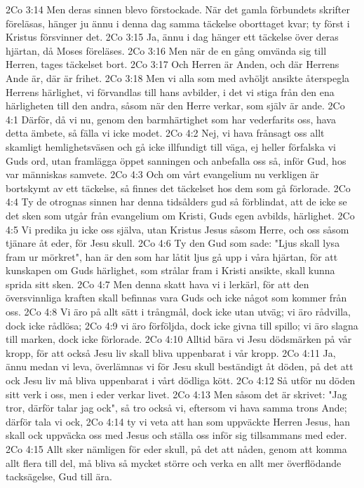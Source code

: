 2Co 3:14  Men deras sinnen blevo förstockade. När det gamla förbundets skrifter föreläsas, hänger ju ännu i denna dag samma täckelse oborttaget kvar; ty först i Kristus försvinner det.
2Co 3:15  Ja, ännu i dag hänger ett täckelse över deras hjärtan, då Moses föreläses.
2Co 3:16  Men när de en gång omvända sig till Herren, tages täckelset bort.
2Co 3:17  Och Herren är Anden, och där Herrens Ande är, där är frihet.
2Co 3:18  Men vi alla som med avhöljt ansikte återspegla Herrens härlighet, vi förvandlas till hans avbilder, i det vi stiga från den ena härligheten till den andra, såsom när den Herre verkar, som själv är ande.
2Co 4:1  Därför, då vi nu, genom den barmhärtighet som har vederfarits oss, hava detta ämbete, så fälla vi icke modet.
2Co 4:2  Nej, vi hava frånsagt oss allt skamligt hemlighetsväsen och gå icke illfundigt till väga, ej heller förfalska vi Guds ord, utan framlägga öppet sanningen och anbefalla oss så, inför Gud, hos var människas samvete.
2Co 4:3  Och om vårt evangelium nu verkligen är bortskymt av ett täckelse, så finnes det täckelset hos dem som gå förlorade.
2Co 4:4  Ty de otrognas sinnen har denna tidsålders gud så förblindat, att de icke se det sken som utgår från evangelium om Kristi, Guds egen avbilds, härlighet.
2Co 4:5  Vi predika ju icke oss själva, utan Kristus Jesus såsom Herre, och oss såsom tjänare åt eder, för Jesu skull.
2Co 4:6  Ty den Gud som sade: "Ljus skall lysa fram ur mörkret", han är den som har låtit ljus gå upp i våra hjärtan, för att kunskapen om Guds härlighet, som strålar fram i Kristi ansikte, skall kunna sprida sitt sken.
2Co 4:7  Men denna skatt hava vi i lerkärl, för att den översvinnliga kraften skall befinnas vara Guds och icke något som kommer från oss.
2Co 4:8  Vi äro på allt sätt i trångmål, dock icke utan utväg; vi äro rådvilla, dock icke rådlösa;
2Co 4:9  vi äro förföljda, dock icke givna till spillo; vi äro slagna till marken, dock icke förlorade.
2Co 4:10  Alltid bära vi Jesu dödsmärken på vår kropp, för att också Jesu liv skall bliva uppenbarat i vår kropp.
2Co 4:11  Ja, ännu medan vi leva, överlämnas vi för Jesu skull beständigt åt döden, på det att ock Jesu liv må bliva uppenbarat i vårt dödliga kött.
2Co 4:12  Så utför nu döden sitt verk i oss, men i eder verkar livet.
2Co 4:13  Men såsom det är skrivet: "Jag tror, därför talar jag ock", så tro också vi, eftersom vi hava samma trons Ande; därför tala vi ock,
2Co 4:14  ty vi veta att han som uppväckte Herren Jesus, han skall ock uppväcka oss med Jesus och ställa oss inför sig tillsammans med eder.
2Co 4:15  Allt sker nämligen för eder skull, på det att nåden, genom att komma allt flera till del, må bliva så mycket större och verka en allt mer överflödande tacksägelse, Gud till ära.
